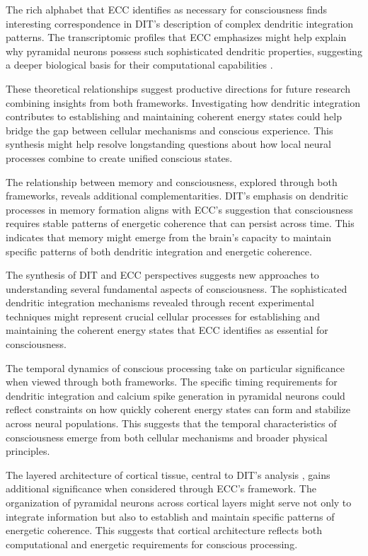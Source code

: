 \begin{refsection}
The rich alphabet that ECC identifies as necessary for consciousness finds interesting correspondence in DIT's description of complex dendritic integration patterns. The transcriptomic profiles that ECC emphasizes might help explain why pyramidal neurons possess such sophisticated dendritic properties, suggesting a deeper biological basis for their computational capabilities \cite{Aru2019}.

These theoretical relationships suggest productive directions for future research combining insights from both frameworks. Investigating how dendritic integration contributes to establishing and maintaining coherent energy states could help bridge the gap between cellular mechanisms and conscious experience. This synthesis might help resolve longstanding questions about how local neural processes combine to create unified conscious states.

The relationship between memory and consciousness, explored through both frameworks, reveals additional complementarities. DIT's emphasis on dendritic processes in memory formation \cite{Shin2021} aligns with ECC's suggestion that consciousness requires stable patterns of energetic coherence that can persist across time. This indicates that memory might emerge from the brain's capacity to maintain specific patterns of both dendritic integration and energetic coherence.

The synthesis of DIT and ECC perspectives suggests new approaches to understanding several fundamental aspects of consciousness. The sophisticated dendritic integration mechanisms revealed through recent experimental techniques \cite{Suzuki2021} might represent crucial cellular processes for establishing and maintaining the coherent energy states that ECC identifies as essential for consciousness.

The temporal dynamics of conscious processing take on particular significance when viewed through both frameworks. The specific timing requirements for dendritic integration and calcium spike generation in pyramidal neurons could reflect constraints on how quickly coherent energy states can form and stabilize across neural populations. This suggests that the temporal characteristics of consciousness emerge from both cellular mechanisms and broader physical principles.

The layered architecture of cortical tissue, central to DIT's analysis \cite{Larkum2013}, gains additional significance when considered through ECC's framework. The organization of pyramidal neurons across cortical layers might serve not only to integrate information but also to establish and maintain specific patterns of energetic coherence. This suggests that cortical architecture reflects both computational and energetic requirements for conscious processing.


\end{refsection}
